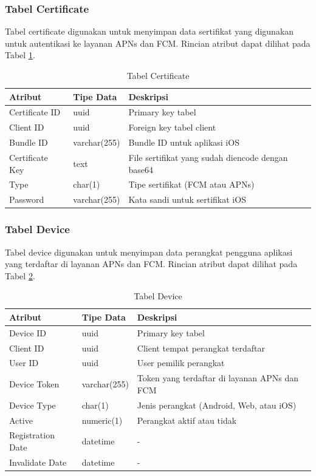 \subsubsection{Tabel Certificate}
\par Tabel certificate digunakan untuk menyimpan data sertifikat yang digunakan untuk autentikasi ke layanan APNs dan FCM. Rincian atribut dapat dilihat pada Tabel \ref{tabel_certificate}.
\begin{longtable}{|p{2cm}|p{2.5cm}|p{4.5cm}|}
	\caption{Tabel Certificate} \label{tabel_certificate} \\ \hline
    \textbf{Atribut} & \textbf{Tipe Data} & \textbf{Deskripsi} \\ \hline
    Certificate ID & uuid & Primary key tabel \\ \hline
    Client ID & uuid & Foreign key tabel client \\ \hline
    Bundle ID & varchar(255) & Bundle ID untuk aplikasi iOS \\ \hline
    Certificate Key & text & File sertifikat yang sudah diencode dengan base64 \\ \hline
    Type & char(1) & Tipe sertifikat (FCM atau APNs) \\ \hline
    Password & varchar(255) & Kata sandi untuk sertifikat iOS \\ \hline
\end{longtable}

\subsubsection{Tabel Device}
\par Tabel device digunakan untuk menyimpan data perangkat pengguna aplikasi yang terdaftar di layanan APNs dan FCM. Rincian atribut dapat dilihat pada Tabel \ref{tabel_device}.
\begin{longtable}{|p{2cm}|p{2.5cm}|p{4.5cm}|}
	\caption{Tabel Device} \label{tabel_device} \\ \hline
    \textbf{Atribut} & \textbf{Tipe Data} & \textbf{Deskripsi} \\ \hline
    Device ID & uuid & Primary key tabel \\ \hline
    Client ID & uuid & Client tempat perangkat terdaftar \\ \hline
    User ID & uuid & User pemilik perangkat \\ \hline
    Device Token & varchar(255) & Token yang terdaftar di layanan APNs dan FCM \\ \hline
    Device Type & char(1) & Jenis perangkat (Android, Web, atau iOS) \\ \hline
    Active & numeric(1) & Perangkat aktif atau tidak \\ \hline
    Registration Date & datetime & - \\ \hline
    Invalidate Date & datetime & - \\ \hline
\end{longtable}

